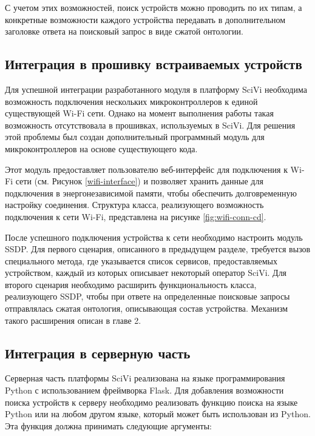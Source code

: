 С учетом этих возможностей, поиск устройств можно проводить по их типам, а конкретные возможности каждого устройства передавать в дополнительном заголовке ответа на поисковый запрос в виде сжатой онтологии.

\subsection{Интеграция в прошивку встраиваемых устройств}

Для успешной интеграции разработанного модуля в платформу SciVi необходима возможность подключения нескольких микроконтроллеров к единой существующей Wi-Fi сети.
Однако на момент выполнения работы такая возможность отсутствовала в прошивках, используемых в SciVi.
Для решения этой проблемы был создан дополнительный программный модуль для микроконтроллеров на основе существующего кода.

Этот модуль предоставляет пользователю веб-интерфейс для подключения к Wi-Fi сети (см.
Рисунок \ref{wifi-interface}) и позволяет хранить данные для подключения в энергонезависимой памяти, чтобы обеспечить долговременную настройку соединения.
Структура класса, реализующего возможность подключения к сети Wi-Fi, представлена на рисунке \ref{fig:wifi-conn-cd}.



После успешного подключения устройства к сети необходимо настроить модуль SSDP.
Для первого сценария, описанного в предыдущем разделе, требуется вызов специального метода, где указывается список сервисов, предоставляемых устройством, каждый из которых описывает некоторый оператор SciVi.
Для второго сценария необходимо расширить функциональность класса, реализующего SSDP, чтобы при ответе на определенные поисковые запросы отправлялась сжатая онтология, описывающая состав устройства.
Механизм такого расширения описан в главе 2.

\subsection{Интеграция в серверную часть}

Серверная часть платформы SciVi реализована на языке программирования Python с использованием фреймворка Flask.
Для добавления возможности поиска устройств к серверу необходимо реализовать функцию поиска на языке Python или на любом другом языке, который может быть использован из Python.
Эта функция должна принимать следующие аргументы:

